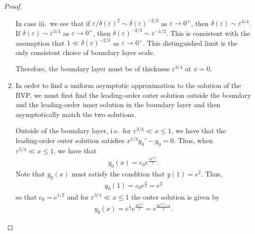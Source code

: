 \documentclass[12pt]{article}
\theoremstyle{definition}
\begin{document}
\begin{proof}
\begin{enumerate}
      In case iii.\ we see that if $\varepsilon/\delta(\varepsilon)^2 \sim \delta(\varepsilon)^{-2/3}$
      as $\varepsilon \to 0^+$, then $\delta(\varepsilon) \sim \varepsilon^{3/4}$.
      If $\delta(\varepsilon) \sim \varepsilon^{3/4}$ as $\varepsilon \to 0^+$,
      then $\delta(\varepsilon)^{-2/3} \sim \varepsilon^{-1/2}$. This is consistent
      with the assumption that $1 \ll \delta(\varepsilon)^{-2/3}$ as $\varepsilon \to 0^+$.
      This distinguished limit is the only consistent choice of boundary layer scale.

      Therefore, the boundary layer must be of thickness $\varepsilon^{3/4}$ at $x=0$.
    \item In order to find a uniform asymptotic approximation to the solution
      of the BVP, we must first find the leading-order outer solution outside
      the boundary and the leading-order inner solution in the boundary layer
      and then asymptotically match the two solutions.

      Outside of the boundary layer, i.e.\ for $\varepsilon^{3/4} \ll x \leq 1$, we have
      that the leading-order outer solution satisfies $x^{1/3}y_0' - y_0 = 0$.
      Thus, when $\varepsilon^{3/4}\ll x \leq 1$, we have that
      \begin{align*}
        y_0(x) = c_0 e^{\frac{3x^{2/3}}{2}}.
      \end{align*}
      Note that $y_0(x)$ must satisfy the condition that $y(1) = e^2$. Thus,
      \begin{align*}
        y_0(1) = c_0 e^{\frac{3}{2}} = e^2
      \end{align*}
      so that $c_0 = e^{1/2}$ and for $\varepsilon^{3/4} \ll x \leq 1$ the outer solution is given by
      \begin{align*}
        y_0(x) = e^{\frac{1}{2}} e^{\frac{3x^{2/3}}{2}} = e^{\frac{3x^{2/3} + 1}{2}}.
      \end{align*}


\end{enumerate}
\end{proof}
\end{document}
